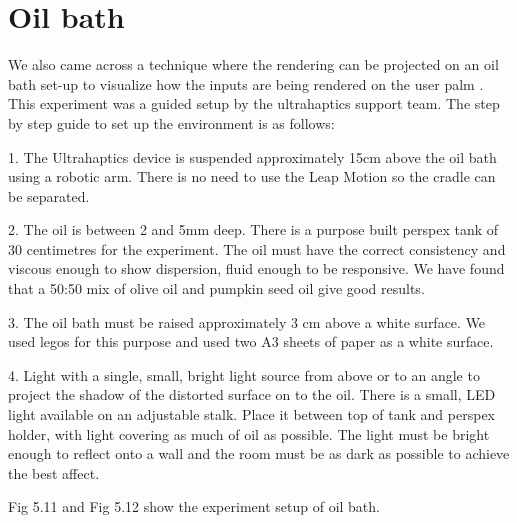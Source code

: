 \section{Oil bath}
\label{sec:validation:oilbath}

We also came across a technique where the rendering can be projected on an oil bath set-up to visualize how the inputs are being rendered on the user palm \cite{oil}. This experiment was a guided setup by the ultrahaptics support team. The step by step guide to set up the environment is as follows:

1. The Ultrahaptics device is suspended approximately 15cm above the oil bath using a robotic arm. There is no need to use the Leap Motion so the cradle can be separated. 

2. The oil is between 2 and 5mm deep. There is a purpose built perspex tank of 30 centimetres for the experiment. The oil must have the correct consistency and viscous enough to show dispersion, fluid enough to be responsive. We have found that a 50:50 mix of olive oil and pumpkin seed oil give good results. 

3. The oil bath must be raised approximately 3 cm above a white surface. We used legos for this purpose and used two A3 sheets of paper as a white surface.

4. Light with a single, small, bright light source from above or to an angle to project the shadow of the distorted surface on to the oil. There is a small, LED light available on an adjustable stalk. Place it between top of tank and perspex holder, with light covering as much of oil as possible. The light must be bright enough to reflect onto a wall and the room must be as dark as possible to achieve the best affect.

Fig 5.11 and Fig 5.12 show the experiment setup of oil bath. 

